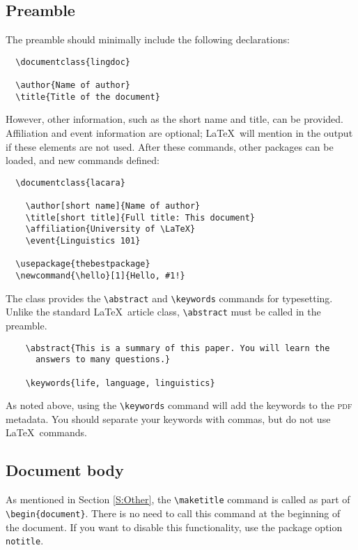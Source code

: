 \documentclass[11pt, tipa, color]{./lingdoc}
\newcommand{\Option}[1]{\texttt{#1}}
\begin{document}
  \subsection{Preamble}
  
    The preamble should minimally include the following declarations:
    
\begin{verbatim}
  \documentclass{lingdoc}

  \author{Name of author}
  \title{Title of the document}
\end{verbatim}

    \noindent However, other information, such as the short name and title, can be provided. Affiliation and event information are optional; \LaTeX\  will mention in the output if these elements are not used. After these commands, other packages can be loaded, and new commands defined:
    
\begin{verbatim}
  \documentclass{lacara}

    \author[short name]{Name of author}
    \title[short title]{Full title: This document}
    \affiliation{University of \LaTeX}
    \event{Linguistics 101}

  \usepackage{thebestpackage}
  \newcommand{\hello}[1]{Hello, #1!}
\end{verbatim}

  \noindent The class provides the \verb+\abstract+ and \verb+\keywords+ commands for typesetting. Unlike the standard \LaTeX\ article class, \verb+\abstract+ must be called in the preamble.
  
  
\begin{verbatim}
    \abstract{This is a summary of this paper. You will learn the
      answers to many questions.}
	
    \keywords{life, language, linguistics}
\end{verbatim}

    \noindent As noted above, using the \verb+\keywords+ command will add the keywords to the \textsc{pdf} metadata. You should separate your keywords with commas, but do not use \LaTeX\ commands.
    
  \subsection{Document body}
  
    As mentioned in Section \ref{S:Other}, the \verb+\maketitle+ command is called as part of \verb+\begin{document}+. There is no need to call this command at the beginning of the document. If you want to disable this functionality, use the package option \Option{notitle}.
\end{document}
